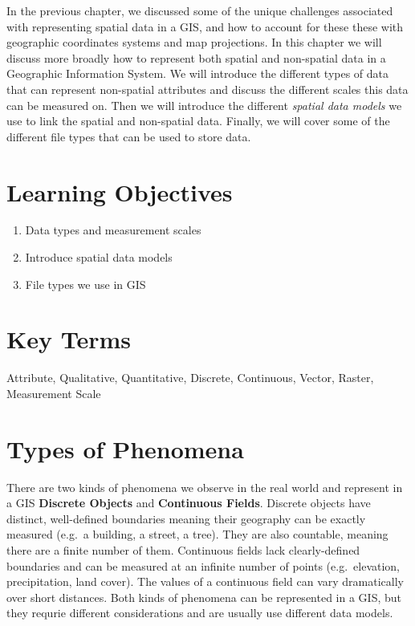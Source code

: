 \documentclass[
]{book}
\providecommand{\tightlist}{%
  \setlength{\itemsep}{0pt}\setlength{\parskip}{0pt}}
\begin{document}
In the previous chapter, we discussed some of the unique challenges associated with representing spatial data in a GIS, and how to account for these these with geographic coordinates systems and map projections. In this chapter we will discuss more broadly how to represent both spatial and non-spatial data in a Geographic Information System. We will introduce the different types of data that can represent non-spatial attributes and discuss the different scales this data can be measured on. Then we will introduce the different \emph{spatial data models} we use to link the spatial and non-spatial data. Finally, we will cover some of the different file types that can be used to store data.

\hypertarget{learning-objectives-2}{%
\section*{Learning Objectives}\label{learning-objectives-2}}

\begin{enumerate}
\def\labelenumi{\arabic{enumi}.}
\tightlist
\item
  Data types and measurement scales
\item
  Introduce spatial data models
\item
  File types we use in GIS
\end{enumerate}

\hypertarget{key-terms-2}{%
\section*{Key Terms}\label{key-terms-2}}

Attribute, Qualitative, Quantitative, Discrete, Continuous, Vector, Raster, Measurement Scale

\hypertarget{types-of-phenomena}{%
\section{Types of Phenomena}\label{types-of-phenomena}}

There are two kinds of phenomena we observe in the real world and represent in a GIS \textbf{Discrete Objects} and \textbf{Continuous Fields}. Discrete objects have distinct, well-defined boundaries meaning their geography can be exactly measured (e.g.~a building, a street, a tree). They are also countable, meaning there are a finite number of them. Continuous fields lack clearly-defined boundaries and can be measured at an infinite number of points (e.g.~elevation, precipitation, land cover). The values of a continuous field can vary dramatically over short distances. Both kinds of phenomena can be represented in a GIS, but they requrie different considerations and are usually use different data models.
\end{document}
